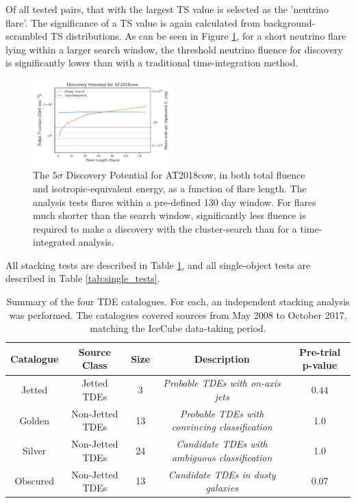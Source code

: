 \documentclass[twocolumn, tighten, linenumbers]{aastex62}
\begin{document}
Of all tested pairs, that with the largest TS value is selected as the 'neutrino flare'. The significance of a TS value is again calculated from background-scrambled TS distributions. As can be seen in Figure \ref{fig:DiscTime}, for a short neutrino flare lying within a larger search window, the threshold neutrino fluence for discovery is significantly lower than with a traditional time-integration method.

\begin{figure}[!ht]
	\centering \includegraphics[width=0.48\textwidth]{figures/flare_vs_box_disc}
	\caption{The $5\sigma$ Discovery Potential for AT2018cow, in both total fluence and isotropic-equivalent energy, as a function of flare length. The analysis tests flares within a pre-defined 130 day window. For flares much shorter than the search window, significantly less fluence is required to make a discovery with the cluster-search than for a time-integrated analysis.}
	\label{fig:DiscTime}
\end{figure}

All stacking tests are described in Table \ref{tab:stacking_tests}, and all single-object tests are described in Table \ref{tab:single_tests}.

\begin{table}[]
	\centering
	\begin{tabular}{||c c c c | c||} 
		\hline
		Catalogue & Source Class & Size & Description  & Pre-trial p-value\\ [0.5ex] 
		\hline\hline
		Jetted & Jetted TDEs &  3 & \textit{Probable TDEs with on-axis jets} & 0.44\\ 
		\hline
		Golden & Non-Jetted TDEs & 13 & \textit{Probable TDEs with convincing classification}&1.0\\
		\hline
		Silver & Non-Jetted TDEs & 24 & \textit{Candidate TDEs with ambiguous classification}&1.0\\
		\hline
		Obscured & Non-Jetted TDEs & 13 & \textit{Candidate TDEs in dusty galaxies}&0.07\\[1ex] 
		\hline
	\end{tabular}
	\caption{Summary of the four TDE catalogues. For each, an independent stacking analysis was performed. The catalogues covered sources from May 2008 to October 2017, matching the IceCube data-taking period.}
	\label{tab:stacking_tests}
\end{table}{}
\end{document}
